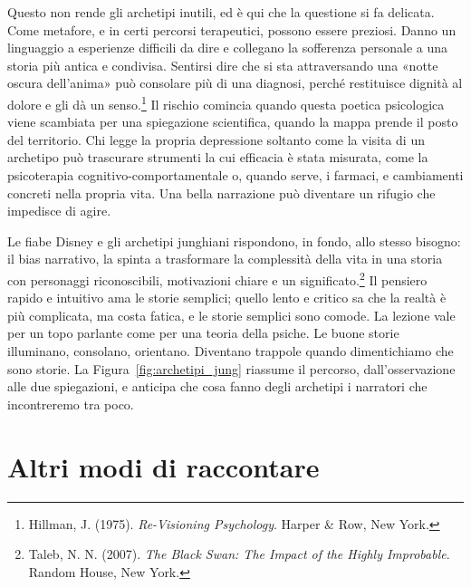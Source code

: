Questo non rende gli archetipi inutili, ed è qui che la questione si fa delicata. Come metafore, e in certi percorsi terapeutici, possono essere preziosi. Danno un linguaggio a esperienze difficili da dire e collegano la sofferenza personale a una storia più antica e condivisa. Sentirsi dire che si sta attraversando una «notte oscura dell'anima» può consolare più di una diagnosi, perché restituisce dignità al dolore e gli dà un senso.\footnote{Hillman, J. (1975). \textit{Re-Visioning Psychology}. Harper \& Row, New York.} Il rischio comincia quando questa poetica psicologica viene scambiata per una spiegazione scientifica, quando la mappa prende il posto del territorio. Chi legge la propria depressione soltanto come la visita di un archetipo può trascurare strumenti la cui efficacia è stata misurata, come la psicoterapia cognitivo-comportamentale o, quando serve, i farmaci, e cambiamenti concreti nella propria vita. Una bella narrazione può diventare un rifugio che impedisce di agire.

Le fiabe Disney e gli archetipi junghiani rispondono, in fondo, allo stesso bisogno: il bias narrativo, la spinta a trasformare la complessità della vita in una storia con personaggi riconoscibili, motivazioni chiare e un significato.\footnote{Taleb, N. N. (2007). \textit{The Black Swan: The Impact of the Highly Improbable}. Random House, New York.} Il pensiero rapido e intuitivo ama le storie semplici; quello lento e critico sa che la realtà è più complicata, ma costa fatica, e le storie semplici sono comode. La lezione vale per un topo parlante come per una teoria della psiche. Le buone storie illuminano, consolano, orientano. Diventano trappole quando dimentichiamo che sono storie. La Figura~\ref{fig:archetipi_jung} riassume il percorso, dall'osservazione alle due spiegazioni, e anticipa che cosa fanno degli archetipi i narratori che incontreremo tra poco.


\section{Altri modi di raccontare}
\label{sec:p2c24-alternative}

